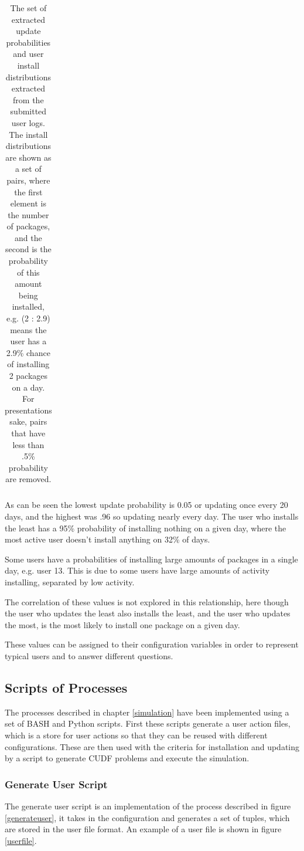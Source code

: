\begin{table}
\begin{tabular}{|l|l ||  p{8.5cm}|}
\end{tabular}
\caption[Extracted User Log Information]{The set of extracted update probabilities and user install distributions extracted from the submitted user logs.
The install distributions are shown as a set of pairs, where the first element is the number of packages, and the second is the probability of this amount being installed, 
e.g. (2 : 2.9) means the user has a 2.9\% chance of installing 2 packages on a day.
For presentations sake, pairs that have less than .5\% probability are removed.}
\label{userlogvariables}
\end{table}

As can be seen the lowest update probability is 0.05 or updating once every 20 days, and the highest was .96 so updating nearly every day.
The user who installs the least has a 95\% probability of installing nothing on a given day, where the most active user doesn't install anything on 32\% of days.

Some users have a probabilities of installing large amounts of packages in a single day, e.g. user 13.
This is due to some users have large amounts of activity installing, separated by low activity.

The correlation of these values is not explored in this relationship, here though the user who updates the least also installs the least,
and the user who updates the most, is the most likely to install one package on a given day.

These values can be assigned to their configuration variables in order to represent typical users and to answer different questions.

\subsection{Scripts of Processes}
The processes described in chapter \ref{simulation} have been implemented using a set of BASH and Python scripts.
First these scripts generate a user action files, which is a store for user actions so that they can be reused with different configurations.
These are then used with the criteria for installation and updating by a script to generate CUDF problems and execute the simulation.

\subsubsection{Generate User Script}
The generate user script is an implementation of the process described in figure \ref{generateuser}, 
it takes in the configuration and generates a set of tuples, which are stored in the user file format.
An example of a user file is shown in figure \ref{userfile}.

